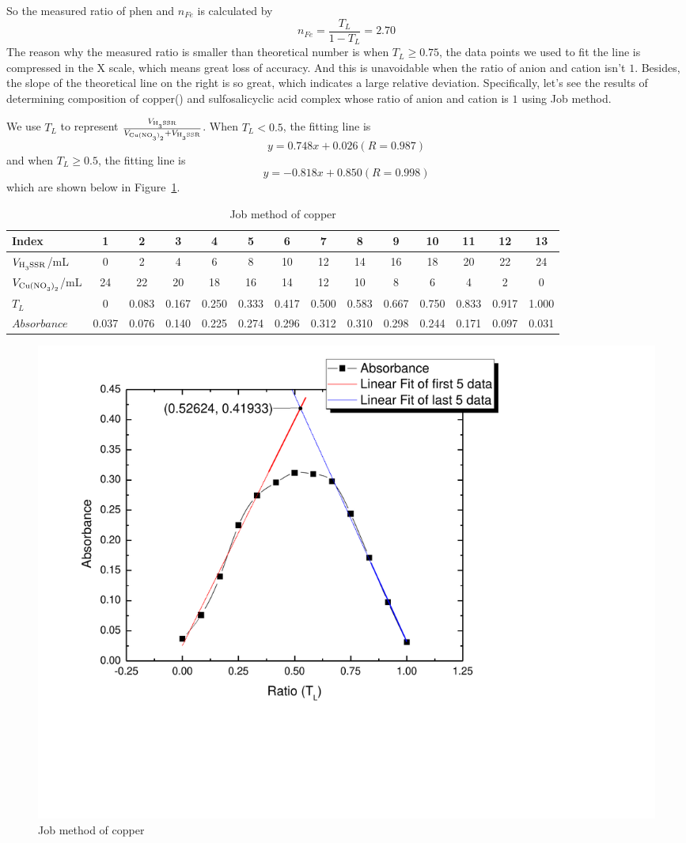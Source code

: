 So the measured ratio of phen and  $n_{Fe}$ is calculated by$$n_{Fe}=\frac{T_L}{1-T_L}=2.70$$The reason why the measured ratio is smaller than theoretical number is when $T_L\geq0.75$, the data points we used to fit the line is compressed in the X scale, which means great loss of accuracy. And this is unavoidable when the ratio of anion and cation isn't $1$. Besides, the slope of the theoretical line on the right is so great, which indicates a large relative deviation. Specifically, let's see the results of determining composition of copper(\uppercase\expandafter{}) and sulfosalicyclic acid complex whose ratio of anion and cation is $1$ using Job method.

We use $T_L$ to represent $\frac{V_{\ce{H3SSR}}}{V_{\ce{Cu(NO3)2}}+V_{\ce{H3SSR}}}$. When $T_L<0.5$, the fitting line is$$y=0.748x+0.026(R=0.987)$$and when $T_L\geq0.5$, the fitting line is$$y=-0.818x+0.850(R=0.998)$$ which are shown below in Figure~\ref{copper}.

\begin{table}[H]
	\caption{Job method of copper}
	\label{Tab.Jbm2}
	\begin{tabular}{lccccccccccccc}
	\toprule
	Index					&1		&2		&3		&4		&5		&6		&7		&8		&9		&10		&11		&12		&13\\
	\midrule
	$V_{\ce{H3SSR}}$/mL 	&0		&2		&4		&6		&8		&10		&12		&14		&16		&18		&20		&22		&24\\
	$V_{\ce{Cu(NO3)2}}$/mL  &24		&22		&20		&18		&16		&14		&12		&10		&8		&6		&4		&2		&0	\\
	$T_L$					&0		&0.083	&0.167	&0.250	&0.333	&0.417	&0.500	&0.583	&0.667	&0.750	&0.833	&0.917	&1.000\\
	$Absorbance$ 			&0.037	&0.076	&0.140	&0.225	&0.274	&0.296	&0.312	&0.310	&0.298	&0.244	&0.171	&0.097	&0.031\\
	\bottomrule
	\end{tabular}
\end{table}

\begin{figure}[H]
	\includegraphics[width=\linewidth]{copper.pdf}
	\caption{Job method of copper}
	\label{copper}
\end{figure}

